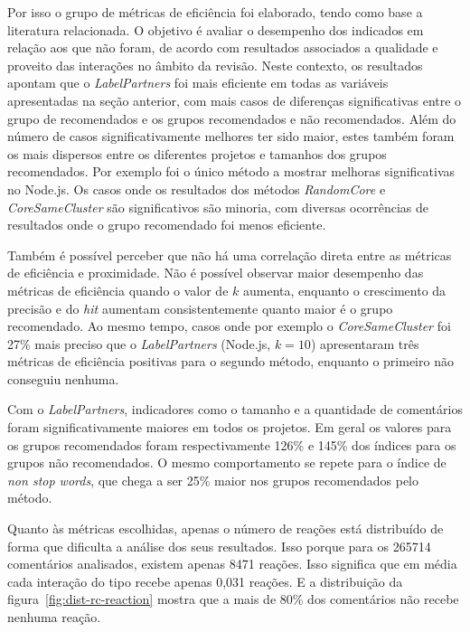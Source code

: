 \documentclass[12pt,openany,oneside,a4paper,english,brazil]{abntbibufjf}
\begin{document}
Por isso o grupo de métricas de eficiência foi elaborado, tendo como base a literatura relacionada. O objetivo é avaliar o desempenho dos indicados em relação aos que não foram, de acordo com resultados associados a qualidade e proveito das interações no âmbito da revisão. Neste contexto, os resultados apontam que o \textit{LabelPartners} foi mais eficiente em todas as variáveis apresentadas na seção anterior, com mais casos de diferenças significativas entre o grupo de recomendados e os grupos recomendados e não recomendados. Além do número de casos significativamente melhores ter sido maior, estes também foram os mais dispersos entre os diferentes projetos e tamanhos dos grupos recomendados. Por exemplo foi  o único método a mostrar melhoras significativas no Node.js. Os casos onde os resultados dos métodos \textit{RandomCore} e \textit{CoreSameCluster} são significativos são minoria, com diversas ocorrências de resultados onde o grupo recomendado foi menos eficiente.

Também é possível perceber que não há uma correlação direta entre as métricas de eficiência e proximidade. Não é possível observar maior desempenho das métricas de eficiência quando o valor de $k$ aumenta, enquanto o crescimento da precisão e do \textit{hit} aumentam consistentemente quanto maior é o grupo recomendado. Ao mesmo tempo, casos onde por exemplo o \textit{CoreSameCluster} foi 27\% mais preciso que o \textit{LabelPartners} (Node.js, $k = 10$) apresentaram três métricas de eficiência positivas para o segundo método, enquanto o primeiro não conseguiu nenhuma.

Com o \textit{LabelPartners}, indicadores como o tamanho e a quantidade de comentários foram significativamente maiores em todos os projetos. Em geral os valores para os grupos recomendados foram respectivamente 126\% e 145\% dos índices para os grupos não recomendados. O mesmo comportamento se repete para o índice de \textit{non stop words}, que chega a ser 25\% maior nos grupos recomendados pelo método.

Quanto às métricas escolhidas, apenas o número de reações está distribuído de forma que dificulta a análise dos seus resultados. Isso porque para os 265714 comentários analisados, existem apenas 8471 reações. Isso significa que em média cada interação do tipo recebe apenas 0,031 reações. E a distribuição da figura~\ref{fig:dist-rc-reaction} mostra que a mais de 80\% dos comentários não recebe nenhuma reação.
\end{document}
